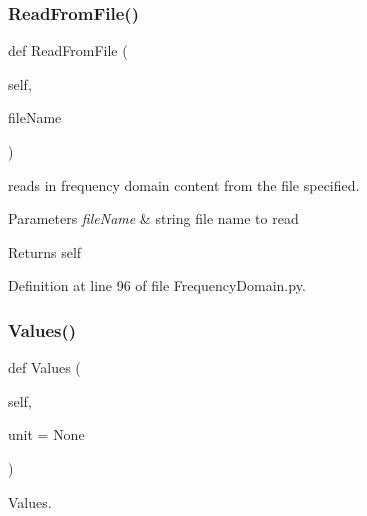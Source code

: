 \subsubsection{\texorpdfstring{Read\+From\+File()}{ReadFromFile()}}
{\footnotesize\ttfamily def Read\+From\+File (\begin{DoxyParamCaption}\item[{}]{self,  }\item[{}]{file\+Name }\end{DoxyParamCaption})}



reads in frequency domain content from the file specified. 


\begin{DoxyParams}{Parameters}
{\em file\+Name} & string file name to read \\
\hline
\end{DoxyParams}
\begin{DoxyReturn}{Returns}
self 
\end{DoxyReturn}


Definition at line 96 of file Frequency\+Domain.\+py.

\mbox{\label{classSignalIntegrity_1_1FrequencyDomain_1_1FrequencyDomain_1_1FrequencyDomain_a3dc7b1e5eba8fb649156094dfdf7a893}} 
\subsubsection{\texorpdfstring{Values()}{Values()}}
{\footnotesize\ttfamily def Values (\begin{DoxyParamCaption}\item[{}]{self,  }\item[{}]{unit = {\ttfamily None} }\end{DoxyParamCaption})}



Values. 


